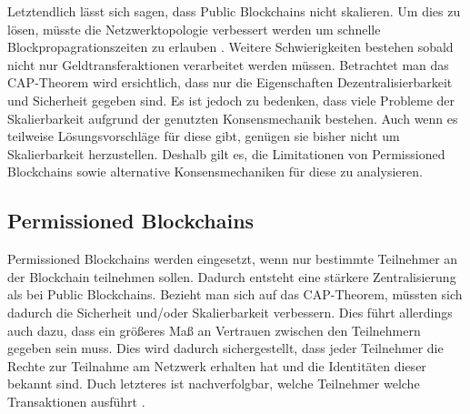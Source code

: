 Letztendlich lässt sich sagen, dass Public Blockchains nicht skalieren. Um dies zu lösen, müsste die Netzwerktopologie verbessert werden um schnelle Blockpropagrationszeiten zu erlauben \cite{SchererPerformanceScalabilityBlockchain2017}. Weitere Schwierigkeiten bestehen sobald nicht nur Geldtransferaktionen verarbeitet werden müssen. Betrachtet man das CAP-Theorem wird ersichtlich, dass nur die Eigenschaften Dezentralisierbarkeit und Sicherheit gegeben sind. Es ist jedoch zu bedenken, dass viele Probleme der Skalierbarkeit aufgrund der genutzten Konsensmechanik bestehen. Auch wenn es teilweise Lösungsvorschläge für diese gibt, genügen sie bisher nicht um Skalierbarkeit herzustellen. Deshalb gilt es, die Limitationen von Permissioned Blockchains sowie alternative Konsensmechaniken für diese zu analysieren.


\subsection{Permissioned Blockchains}
Permissioned Blockchains werden eingesetzt, wenn nur bestimmte Teilnehmer an der Blockchain teilnehmen sollen.  Dadurch entsteht eine stärkere Zentralisierung als bei Public Blockchains. Bezieht man sich auf das CAP-Theorem, müssten sich dadurch die Sicherheit und/oder Skalierbarkeit verbessern. Dies führt allerdings auch dazu, dass ein größeres Maß an Vertrauen zwischen den Teilnehmern gegeben sein muss. Dies wird dadurch sichergestellt, dass jeder Teilnehmer die Rechte zur Teilnahme am Netzwerk erhalten hat und die Identitäten dieser bekannt sind. Duch letzteres ist nachverfolgbar, welche Teilnehmer welche Transaktionen ausführt \cite{SchererPerformanceScalabilityBlockchain2017}.

